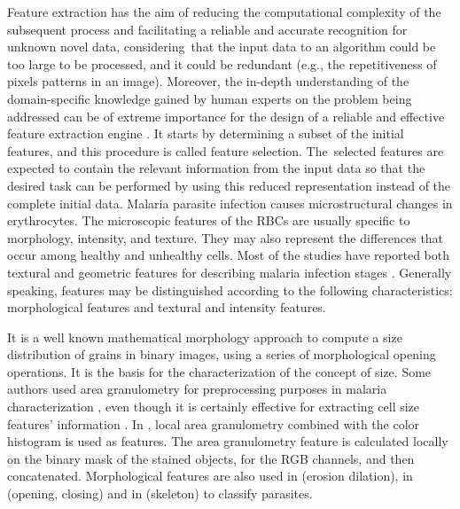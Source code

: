 \documentclass[final,a4paper,12pt,english]{UnicaPhdThesis3}
\begin{document}
{	%
	
	Feature extraction has the aim of reducing the computational complexity of the subsequent process and facilitating a reliable and accurate recognition for unknown novel data, considering~that the input data to an algorithm could be too large to be processed, and it could be redundant (e.g., the repetitiveness of pixels patterns in an image). Moreover, the in-depth understanding of the domain-specific knowledge gained by human experts on the problem being addressed can be of extreme importance for the design of a reliable and effective feature extraction engine \cite{Jiang2009}.
	It starts by determining a subset of the initial features, and this procedure is called feature selection. The~selected features are expected to contain the relevant information from the input data so that the desired task can be performed by using this reduced representation instead of the complete initial data.
	Malaria parasite infection causes microstructural changes in erythrocytes. The microscopic features of the RBCs are usually specific to morphology, intensity, and texture. They may also represent the differences that occur among healthy and unhealthy cells. Most of the studies have reported both textural and geometric features for describing malaria infection stages \cite{Das2015}.
	Generally speaking, features may be distinguished according to the following characteristics: morphological features and textural and intensity features.
	
	It is a well known mathematical morphology approach to compute a size distribution of grains in binary images, using a series of morphological opening operations. It is the basis for the characterization of the concept of size. Some authors used area granulometry for preprocessing purposes in malaria characterization \cite{Tek2010}, even though it is certainly effective for extracting cell size features' information \cite{Springl2009, Tek2006, Malihi2013}. In \cite{Tek2010}, local area granulometry combined with the color histogram is used as features. The area granulometry feature is calculated locally on the binary mask of the stained objects, for the RGB channels, and then concatenated. Morphological features are also used in \cite{Ross2006} (erosion dilation), in \cite{Das2011} (opening, closing) and in \cite{DiRuberto2002} (skeleton) to classify parasites.
	
}
\end{document}

